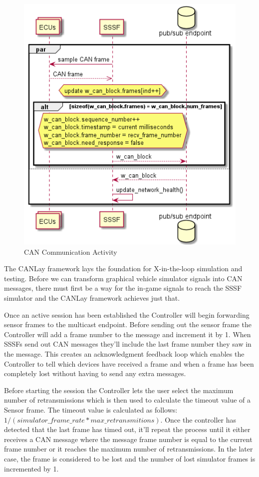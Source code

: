 \documentclass[letterpaper,twocolumn,10pt]{article}
\begin{document}
\begin{figure}[t!]
    \centering
    \includegraphics[scale=0.8]{out/images/can_exchange/can_exchange.png}
    \caption{CAN Communication Activity}
    \label{fig:can_x}
\end{figure}

The CANLay framework lays the foundation for X-in-the-loop simulation and testing.
Before we can transform graphical vehicle simulator signals into CAN messages, there must first be a way for the in-game signals to reach the SSSF simulator and the CANLay framework achieves just that. 

Once an active session has been established the Controller will begin forwarding sensor frames to the multicast endpoint. Before sending out the sensor frame the Controller will add a frame number to the message and increment it by 1. When SSSFs send out CAN messages they’ll include the last frame number they saw in the message. This creates an acknowledgment feedback loop which enables the Controller to tell which devices have received a frame and when a frame has been completely lost without having to send any extra messages.

Before starting the session the Controller lets the user select the maximum number of retransmissions which is then used to calculate the timeout value of a Sensor frame. The timeout value is calculated as follows: %
 $1/(simulator\_frame\_rate * max\_retransmitions)$.
Once the controller has detected that the last frame has timed out, it’ll repeat the process until it either receives a CAN message where the message frame number is equal to the current frame number or it reaches the maximum number of retransmissions. In the later case, the frame is considered to be lost and the number of lost simulator frames is incremented by 1.
\end{document}
